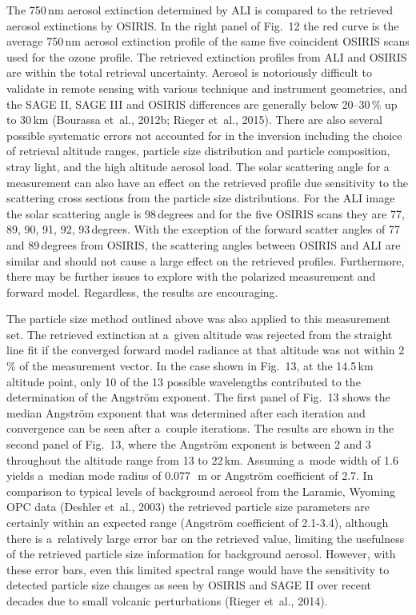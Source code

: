 \documentclass[amtd, online, hvmath]{copernicus}
\begin{document}
The 750\,\unit{nm} aerosol extinction determined by ALI is compared to the retrieved aerosol extinctions by OSIRIS. In the right panel of Fig.~12 the red curve is the average 750\,\unit{nm} aerosol extinction profile of the
same five coincident OSIRIS scans used for the ozone profile. The
retrieved extinction profiles from ALI and OSIRIS are within the
total retrieval uncertainty. Aerosol is notoriously
difficult to validate in remote sensing with various technique and
instrument geometries, and the SAGE II, SAGE III and OSIRIS
differences are generally below 20--30\,{\%} up to 30\,\unit{km}
(Bourassa et~al., 2012b; Rieger et~al., 2015). There are also several possible systematic errors not
accounted for in the inversion including the choice of retrieval
altitude ranges, particle size distribution and  particle composition, stray
light, and the high altitude aerosol load. The solar scattering angle for a measurement can also have an effect on the retrieved profile due sensitivity to the scattering cross sections from the particle size distributions. For the ALI image the solar scattering angle is 98\,degrees and for the five OSIRIS scans they are 77, 89, 90, 91, 92, 93\,degrees. With the exception of the forward scatter angles of 77 and 89\,degrees from OSIRIS, the scattering angles between OSIRIS and ALI are similar and should not cause a large effect on the retrieved profiles. Furthermore, there may be
further issues to explore with the polarized measurement and forward
model. Regardless, the results are encouraging.

The particle size method outlined above was also applied to this
measurement set. The retrieved extinction at a~given altitude was
rejected from the straight line fit if the converged forward model
radiance at that altitude was not within 2\,{\%} of the measurement
vector. In the case shown in Fig.~13, at the 14.5\,\unit{km} altitude
point, only 10 of the 13 possible wavelengths contributed to the
determination of the Angstr\"{o}m exponent. The first panel of Fig.~13
shows the median Angstr\"{o}m exponent that was determined after each
iteration and convergence can be seen after a~couple iterations. The
results are shown in the second panel of Fig.~13, where the
Angstr\"{o}m exponent is between 2 and 3 throughout the altitude range
from 13 to 22\,\unit{km}. Assuming a~mode width of 1.6 yields a~median
mode radius of 0.077\,\unit{{\mu}m} or Angstr\"{o}m coefficient of 2.7. In comparison to typical levels
of background aerosol from the Laramie, Wyoming OPC data (Deshler
et~al., 2003) the retrieved particle size parameters are certainly
within an expected range (Angstr\"{o}m coefficient of 2.1-3.4), although there is a~relatively large error
bar on the retrieved value, limiting the usefulness of the retrieved
particle size information for background aerosol. However, with these
error bars, even this limited spectral range would have the
sensitivity to detected particle size changes as seen by OSIRIS and
SAGE II over recent decades due to small volcanic perturbations
(Rieger et~al., 2014).
\end{document}
